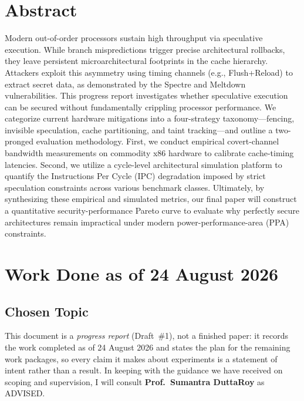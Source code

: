 \documentclass[11pt,a4paper]{article}
\begin{document}
\clearpage
\tableofcontents
\clearpage

\section*{\Huge{Abstract}}
Modern out-of-order processors sustain high throughput via speculative execution. While branch mispredictions trigger precise architectural rollbacks, they leave persistent microarchitectural footprints in the cache hierarchy. Attackers exploit this asymmetry using timing channels (e.g., Flush+Reload) to extract secret data, as demonstrated by the Spectre and Meltdown vulnerabilities. This progress report investigates whether speculative execution can be secured without fundamentally crippling processor performance. We categorize current hardware mitigations into a four-strategy taxonomy—fencing, invisible speculation, cache partitioning, and taint tracking—and outline a two-pronged evaluation methodology. First, we conduct empirical covert-channel bandwidth measurements on commodity x86 hardware to calibrate cache-timing latencies. Second, we utilize a cycle-level architectural simulation platform to quantify the Instructions Per Cycle (IPC) degradation imposed by strict speculation constraints across various benchmark classes. Ultimately, by synthesizing these empirical and simulated metrics, our final paper will construct a quantitative security-performance Pareto curve to evaluate why perfectly secure architectures remain impractical under modern power-performance-area (PPA) constraints.
\clearpage


\section{Work Done as of 24 August 2026}

\subsection{Chosen Topic}
This document is a \emph{progress report} (Draft~\#1), not a finished paper: it
records the work completed as of 24 August 2026 and states the plan for the
remaining work packages, so every claim it makes about experiments is a
statement of intent rather than a result. In keeping with the guidance we have
received on scoping and supervision, I will consult \textbf{Prof.\ Sumantra DuttaRoy} as
ADVISED.
\end{document}
